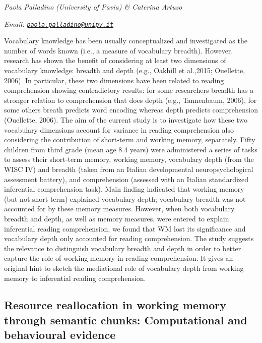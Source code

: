 \documentclass[12pt,]{book}
\begin{document}
\emph{Paola Palladino (University of Pavia) \& Caterina Artuso}

\emph{Email: \href{mailto:paola.palladino@unipv.it}{\nolinkurl{paola.palladino@unipv.it}}}

Vocabulary knowledge has been usually conceptualized and investigated as the number of words known (i.e., a measure of vocabulary breadth). However, research has shown the benefit of considering at least two dimensions of vocabulary knowledge: breadth and depth (e.g., Oakhill et al.,2015; Ouellette, 2006). In particular, these two dimensions have been related to reading comprehension showing contradictory results: for some researchers breadth has a stronger relation to comprehension that does depth (e.g., Tannenbaum, 2006), for some others breath predicts word encoding whereas depth predicts comprehension (Ouellette, 2006). The aim of the current study is to investigate how these two vocabulary dimensions account for variance in reading comprehension also considering the contribution of short-term and working memory, separately. Fifty children from third grade (mean age 8.4 years) were administered a series of tasks to assess their short-term memory, working memory, vocabulary depth (from the WISC IV) and breadth (taken from an Italian developmental neuropsychological assessment battery), and comprehension (assessed with an Italian standardized inferential comprehension task). Main finding indicated that working memory (but not short-term) explained vocabulary depth; vocabulary breadth was not accounted for by these memory measures. However, when both vocabulary breadth and depth, as well as memory measures, were entered to explain inferential reading comprehension, we found that WM lost its significance and vocabulary depth only accounted for reading comprehension. The study suggests the relevance to distinguish vocabulary breadth and depth in order to better capture the role of working memory in reading comprehension. It gives an original hint to sketch the mediational role of vocabulary depth from working memory to inferential reading comprehension.

\hypertarget{resource-reallocation-in-working-memory-through-semantic-chunks-computational-and-behavioural-evidence}{%
\subsection{Resource reallocation in working memory through semantic chunks: Computational and behavioural evidence}\label{resource-reallocation-in-working-memory-through-semantic-chunks-computational-and-behavioural-evidence}}
\end{document}
